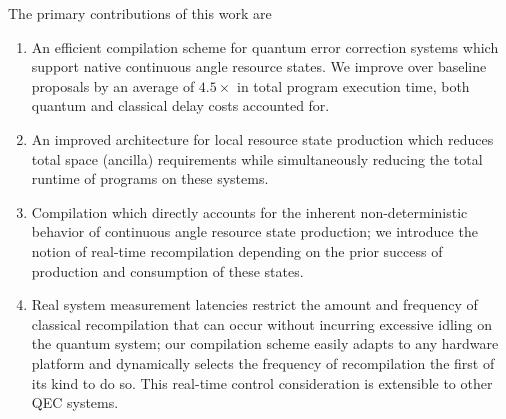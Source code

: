 The primary contributions of this work are
\begin{enumerate}
    \item An efficient compilation scheme for quantum error correction systems which support native continuous angle resource states. We improve over baseline proposals by an average of $4.5\times$ in total program execution time, both quantum and classical delay costs accounted for.
    \item An improved architecture for local resource state production which reduces total space (ancilla) requirements while simultaneously reducing the total runtime of programs on these systems.
    \item Compilation which directly accounts for the inherent non-deterministic behavior of continuous angle resource state production; we introduce the notion of real-time recompilation depending on the prior success of production and consumption of these states.
    \item Real system measurement latencies restrict the amount and frequency of classical recompilation that can occur without incurring excessive idling on the quantum system; our compilation scheme easily adapts to any hardware platform and dynamically selects the frequency of recompilation the first of its kind to do so. This real-time control consideration is extensible to other QEC systems.
\end{enumerate}